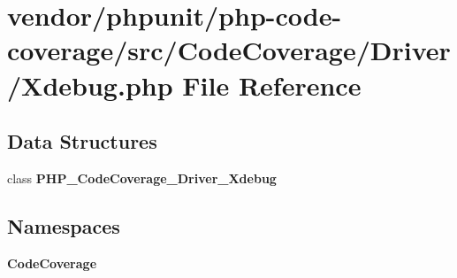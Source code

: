 \section{vendor/phpunit/php-\/code-\/coverage/src/\+Code\+Coverage/\+Driver/\+Xdebug.php File Reference}
\label{_xdebug_8php}
\subsection*{Data Structures}
\begin{DoxyCompactItemize}
\item 
class {\bf P\+H\+P\+\_\+\+Code\+Coverage\+\_\+\+Driver\+\_\+\+Xdebug}
\end{DoxyCompactItemize}
\subsection*{Namespaces}
\begin{DoxyCompactItemize}
\item 
 {\bf Code\+Coverage}
\end{DoxyCompactItemize}
